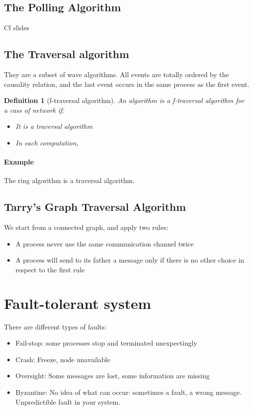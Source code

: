 \documentclass{article}
\newtheorem{defi}{Definition}
\begin{document}
\newpage
\subsection{The Polling Algorithm}
Cf slides


\subsection{The Traversal algorithm}
They are a subset of wave algorithms. All events are totally ordered by the causality relation, and the last event occurs in the same process as the first event.

\begin{defi}[f-traversal algorithm]
An algorithm is a f-traversal algorithm for a cass of network if:
\begin{itemize}[noitemsep]
\item It is a traversal algorithm
\item In each computation, 
\end{itemize}
\end{defi}

\paragraph{Example}
The ring algorithm is a traversal algorithm.

\subsection{Tarry's Graph Traversal Algorithm}
We start from a connected graph, and apply two rules:
\begin{itemize}[noitemsep]
\item A process never use the same communication channel twice 
\item A process will send to its father a message only if there is no other choice in respect to the first rule
\end{itemize}

\begin{algorithm}
\end{algorithm}

\section{Fault-tolerant system}
There are different types of faults:
\begin{itemize}[noitemsep]
\item Fail-stop: some processes stop and terminated unexpectingly
\item Crash: Freeze, node unavailable
\item Oversight: Some messages are lost, some information are missing
\item Byzantine: No idea of what can occur: sometimes a fault, a wrong message. Unpredictible fault in your system. 
\end{itemize}
\end{document}
